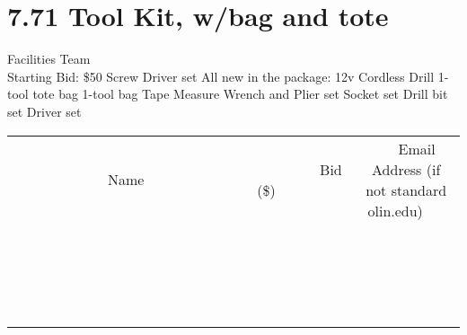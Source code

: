 \documentclass[11pt]{article}
\begin{document}
\section*{7.71 Tool Kit, w/bag and tote}
Facilities Team
\\
Starting Bid: \$50
\newline
Screw Driver set
All new in the package:
12v Cordless Drill
1- tool tote bag
1-tool bag
Tape Measure
Wrench and Plier set
Socket set
Drill bit set
Driver set
\\[3ex]
\begin{tabular}{c c c}
~~~~~~~~~~~~~Name~~~~~~~~~~~~~ & ~~~~~~~~~Bid (\$)~~~~~~~~~  & ~~~Email Address (if not standard olin.edu)~~~\\
 & & \\
\hline
 & & \\
\hline
 & & \\
\hline
 & & \\
\hline
 & & \\
\hline
 & & \\
\hline
 & & \\
\hline
 & & \\
\hline
 & & \\
\hline
 & & \\
\hline
 & & \\
\hline
 & & \\
\hline
 & & \\
\hline
 & & \\
\hline
 & & \\
\hline
 & & \\
\hline
 & & \\
\hline
 & & \\
\hline
 & & \\
\hline
\end{tabular}
\newpage
\end{document}
